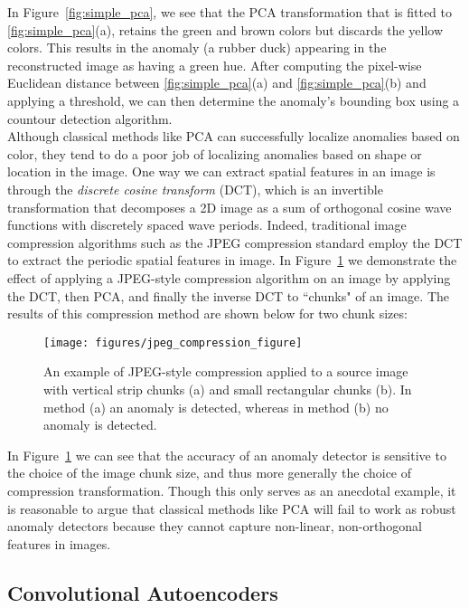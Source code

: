 \documentclass[12pt]{article}
\begin{document}
In Figure~\ref{fig:simple_pca}, we see that the PCA transformation that is fitted to \ref{fig:simple_pca}(a), retains the green and brown colors but discards the yellow colors. This results in the anomaly (a rubber duck) appearing in the reconstructed image as having a green hue. After computing the pixel-wise Euclidean distance between \ref{fig:simple_pca}(a) and \ref{fig:simple_pca}(b) and applying a threshold, we can then determine the anomaly's bounding box using a countour detection algorithm.\\

Although classical methods like PCA can successfully localize anomalies based on color, they tend to do a poor job of localizing anomalies based on shape or location in the image. One way we can extract spatial features in an image is through the \textit{discrete cosine transform} (DCT), which is an invertible transformation that decomposes a 2D image as a sum of orthogonal cosine wave functions with discretely spaced wave periods. Indeed, traditional image compression algorithms such as the JPEG compression standard \cite{jpeg_standard} employ the DCT to extract the periodic spatial features in image. In Figure~\ref{fig:simple_jpeg} we demonstrate the effect of applying a JPEG-style compression algorithm on an image by applying the DCT, then PCA, and finally the inverse DCT to ``chunks" of an image. The results of this compression method are shown below for two chunk sizes: 

\begin{figure}[H]
\begin{center}
\texttt{[image: figures/jpeg\_compression\_figure]}
\end{center}
\caption{An example of JPEG-style compression applied to a source image with vertical strip chunks (a) and small rectangular chunks (b). In method (a) an anomaly is detected, whereas in method (b) no anomaly is detected.}
\label{fig:simple_jpeg}
\end{figure}

In Figure~\ref{fig:simple_jpeg} we can see that the accuracy of an anomaly detector is sensitive to the choice of the image chunk size, and thus more generally the choice of compression transformation. Though this only serves as an anecdotal example, it is reasonable to argue that classical methods like PCA will fail to work as robust anomaly detectors because they cannot capture non-linear, non-orthogonal features in images. 

\subsection{Convolutional Autoencoders}
\end{document}
